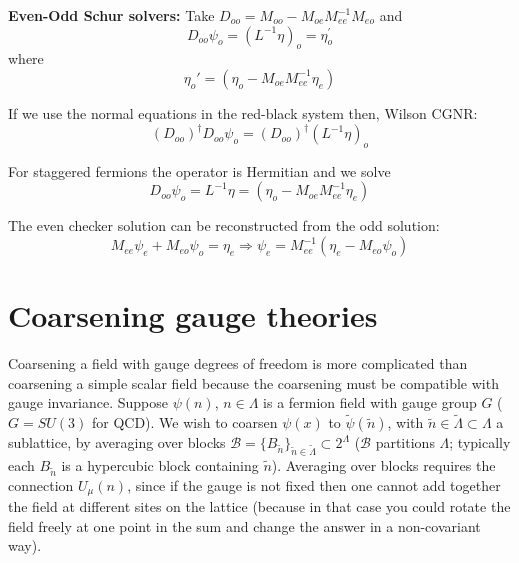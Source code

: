 \documentclass[letter,10pt]{report}
\begin{document}
{\bf Even-Odd Schur solvers:}
Take $D_{oo} = M_{oo} - M_{oe} M_{ee}^{-1} M_{eo}$ and 
$$
D_{oo} \psi_o =  (L^{-1}  \eta)_o = \eta_o^\prime
$$
where
$$\eta_o' = (\eta_o - M_{oe} M_{ee}^{-1} \eta_e)$$

If we use the normal equations in the red-black system then,
Wilson CGNR:
$$      (D_{oo})^{\dag} D_{oo} \psi_o = (D_{oo})^\dagger (L^{-1}  \eta)_o$$

For staggered fermions the operator is Hermitian and we solve
$$
D_{oo} \psi_o = L^{-1}  \eta =    (\eta_o - M_{oe} M_{ee}^{-1} \eta_e)
$$

The even checker solution can be reconstructed from the odd solution:
$$
M_{ee} \psi_e + M_{eo} \psi_o = \eta_e \Rightarrow  \psi_e = M_{ee}^{-1}  ( \eta_e - M_{eo} \psi_o )
$$

\newpage
\section{Coarsening gauge theories}

Coarsening a field with gauge degrees of freedom is more complicated than coarsening a simple scalar field because the coarsening must be compatible with gauge invariance. Suppose $\psi(n)$, $n\in\Lambda$ is a fermion field with gauge group $G$ ($G = SU(3)$ for QCD). We wish to coarsen $\psi(x)$ to $\tilde{\psi}(\tilde{n})$, with $\tilde n\in\tilde\Lambda\subset\Lambda$ a sublattice, by averaging over blocks $\mathcal B = \{B_{\tilde n}\}_{\tilde{n}\in\tilde{\Lambda}}\subset 2^\Lambda$ ($\mathcal B$ partitions $\Lambda$; typically each $B_{\tilde{n}}$ is a hypercubic block containing $\tilde{n}$). Averaging over blocks requires the connection $U_\mu(n)$, since if the gauge is not fixed then one cannot add together the field at different sites on the lattice (because in that case you could rotate the field freely at one point in the sum and change the answer in a non-covariant way). 

\end{document}
